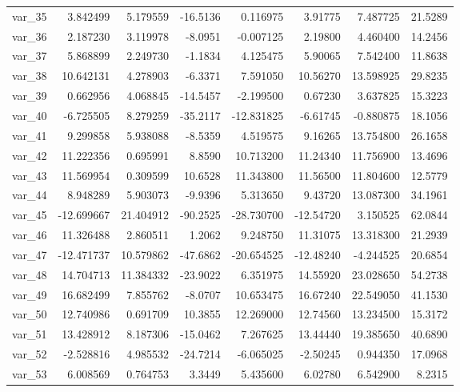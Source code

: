 ﻿\documentclass[12pt]{article}
\begin{document}
\begin{longtable}{lrrrrrrr}
  var\_35 &   3.842499 &   5.179559 & -16.5136 &   0.116975 &   3.91775 &   7.487725 &  21.5289 \\
  var\_36 &   2.187230 &   3.119978 &  -8.0951 &  -0.007125 &   2.19800 &   4.460400 &  14.2456 \\
  var\_37 &   5.868899 &   2.249730 &  -1.1834 &   4.125475 &   5.90065 &   7.542400 &  11.8638 \\
  var\_38 &  10.642131 &   4.278903 &  -6.3371 &   7.591050 &  10.56270 &  13.598925 &  29.8235 \\
  var\_39 &   0.662956 &   4.068845 & -14.5457 &  -2.199500 &   0.67230 &   3.637825 &  15.3223 \\
  var\_40 &  -6.725505 &   8.279259 & -35.2117 & -12.831825 &  -6.61745 &  -0.880875 &  18.1056 \\
  var\_41 &   9.299858 &   5.938088 &  -8.5359 &   4.519575 &   9.16265 &  13.754800 &  26.1658 \\
  var\_42 &  11.222356 &   0.695991 &   8.8590 &  10.713200 &  11.24340 &  11.756900 &  13.4696 \\
  var\_43 &  11.569954 &   0.309599 &  10.6528 &  11.343800 &  11.56500 &  11.804600 &  12.5779 \\
  var\_44 &   8.948289 &   5.903073 &  -9.9396 &   5.313650 &   9.43720 &  13.087300 &  34.1961 \\
  var\_45 & -12.699667 &  21.404912 & -90.2525 & -28.730700 & -12.54720 &   3.150525 &  62.0844 \\
  var\_46 &  11.326488 &   2.860511 &   1.2062 &   9.248750 &  11.31075 &  13.318300 &  21.2939 \\
  var\_47 & -12.471737 &  10.579862 & -47.6862 & -20.654525 & -12.48240 &  -4.244525 &  20.6854 \\
  var\_48 &  14.704713 &  11.384332 & -23.9022 &   6.351975 &  14.55920 &  23.028650 &  54.2738 \\
  var\_49 &  16.682499 &   7.855762 &  -8.0707 &  10.653475 &  16.67240 &  22.549050 &  41.1530 \\
  var\_50 &  12.740986 &   0.691709 &  10.3855 &  12.269000 &  12.74560 &  13.234500 &  15.3172 \\
  var\_51 &  13.428912 &   8.187306 & -15.0462 &   7.267625 &  13.44440 &  19.385650 &  40.6890 \\
  var\_52 &  -2.528816 &   4.985532 & -24.7214 &  -6.065025 &  -2.50245 &   0.944350 &  17.0968 \\
  var\_53 &   6.008569 &   0.764753 &   3.3449 &   5.435600 &   6.02780 &   6.542900 &   8.2315 \\

\end{longtable}
\end{document}
